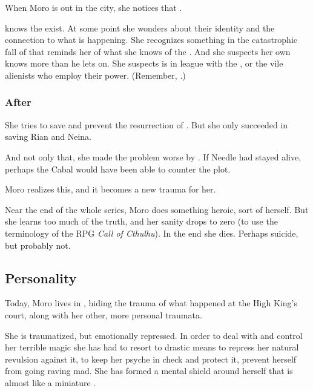 When Moro is out in the city, she notices that . 

\MoroCobrel knows the \xs exist. 
At some point she wonders about their identity and the connection to what is happening.
She recognizes something in the catastrophic fall of \Malcur that reminds her of what she knows of the \xs.
And she suspects her own \Nasshikerr knows more than he lets on. 
She suspects \Nasshikerr is in league with the \xs, or the vile alienists who employ their power.
(Remember, .)






\subsubsection{After \Malcur}
She tries to save \Malcur and prevent the resurrection of \Nithdornazsh. But she only succeeded in saving Rian and Neina. 

And not only that, she made the problem worse by . If Needle had stayed alive, perhaps the Cabal would have been able to counter the \Nithdornazsh{} plot. 

Moro realizes this, and it becomes a new trauma for her. 

Near the end of the whole series, Moro does something heroic, sort of  herself. But she learns too much of the truth, and her sanity drops to zero (to use the terminology of the RPG \emph{Call of Cthulhu}). In the end she dies. Perhaps suicide, but probably not. 









\subsection{Personality}
Today, Moro lives in \Malcur, hiding the trauma of what happened at the High King's court, along with her other, more personal traumata. 

She is traumatized, but emotionally repressed. In order to deal with and control her terrible \chaos{} magic she has had to resort to drastic means to repress her natural revulsion against it, to keep her psyche in check and protect it, prevent herself from going raving mad. She has formed a mental shield around herself that is almost like a miniature \Sephirah. 

